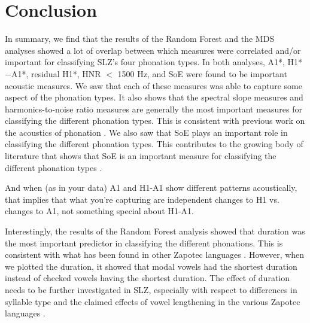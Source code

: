 \section{Conclusion} \label{sec:dt_conclusion}


In summary, we find that the results of the Random Forest and the MDS analyses showed a lot of overlap between which measures were correlated and/or important for classifying SLZ's four phonation types. In both analyses, A1*, H1*$-$A1*, residual H1*, HNR $<$ 1500 Hz, and SoE were found to be important acoustic measures. We saw that each of these measures was able to capture some aspect of the phonation types. It also shows that the spectral slope measures and harmonics-to-noise ratio measures are generally the most important measures for classifying the different phonation types. This is consistent with previous work on the acoustics of phonation \citep[e.g.,][]{garellekPhoneticsVoice2019}. We also saw that SoE plays an important role in classifying the different phonation types. This contributes to the growing body of literature that shows that SoE is an important measure for classifying the different phonation types \citep{chaiPhoneticsGlottalizedPhonations2023,garellekVoicingGlottalConsonants2021,wellerInteractionsToneGlottalization2023,wellerLexicalToneVowel2023,wellerVoiceQualityTone2024}.

And when (as in your data) A1 and H1-A1 show different patterns acoustically, that implies that what you're capturing are independent changes to H1 vs. changes to A1, not something special about H1-A1.

Interestingly, the results of the Random Forest analysis showed that duration was the most important predictor in classifying the different phonations. This is consistent with what has been found in other Zapotec languages \citep[e.g.,][]{barzilaiContextdependentPhoneticEnhancement2021,chaiPerceptionCheckedRearticulated2025,chavez-peonInteractionMetricalStructure2010}. However, when we plotted the duration, it showed that modal vowels had the shortest duration instead of checked vowels having the shortest duration. The effect of duration needs to be further investigated in SLZ, especially with respect to differences in syllable type and the claimed effects of vowel lengthening in the various Zapotec languages \citep[e.g.,][]{chavez-peonInteractionMetricalStructure2010,merrillTilquiapanZapotec2008,nellisFortisLenisCajonos1980,pickettIsthmusJuchitanZapotec2010,uchiharaFortisLenisGlides2016}.




